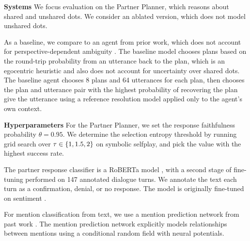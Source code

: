 \documentclass[11pt]{article}
\newcommand{\justin}[1]{{{\textcolor{purple}{(Justin: #1)}}}}
\begin{document}
\textbf{Systems}
We focus evaluation on the Partner Planner,
which reasons about shared and unshared dots.
We consider an ablated version, which does not model unshared dots.

As a baseline, we compare to an agent from prior work, which does not account for
perspective-dependent ambiguity \citep{fried}.
The baseline model chooses plans based on the round-trip probability from an utterance back to the plan,
which is an egocentric heuristic and also does not account for
uncertainty over shared dots.
The baseline agent chooses 8 plans and 64 utterances for each plan, then chooses the
plan and utterance pair with the highest probability of recovering the plan give
the utterance using a reference resolution model applied only to the agent's own context.


\textbf{Hyperparameters}
For the Partner Planner, we set the response faithfulness probability $\theta = 0.95$.
We determine the selection entropy threshold by running grid search over $\tau \in \left\{1,1.5,2\right\}$ on symbolic selfplay, and pick the value with the highest success rate.

The partner response classifier is a RoBERTa model \citep{roberta}, with a second stage of fine-tuning performed on 147 annotated dialogue turns.
We annotate the text each turn as a confirmation, denial, or no response.
The model is originally fine-tuned on sentiment \citep{heitmann2020}.

For mention classification from text, we use a mention prediction network from past work \citep{fried}.
The mention prediction network explicitly models relationships between mentions using a conditional random field with neural potentials.
\end{document}
